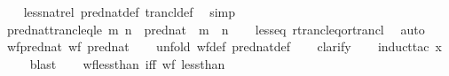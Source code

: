 \begin{isabellebody}
\ \ %
\endisadelimproof
%
\isatagproof
{}\isamarkupfalse%
\ less{\isacharunderscore}{\kern0pt}nat{\isacharunderscore}{\kern0pt}rel\ pred{\isacharunderscore}{\kern0pt}nat{\isacharunderscore}{\kern0pt}def\ trancl{\isacharunderscore}{\kern0pt}def\ \isamarkupfalse%
\ simp%
\endisatagproof
{\isafoldproof}%
%
\isadelimproof
\isanewline
%
\endisadelimproof
\isanewline
{}\isamarkupfalse%
\ pred{\isacharunderscore}{\kern0pt}nat{\isacharunderscore}{\kern0pt}trancl{\isacharunderscore}{\kern0pt}eq{\isacharunderscore}{\kern0pt}le{\isacharcolon}{\kern0pt}\ {\isachardoublequoteopen}{\isacharparenleft}{\kern0pt}m{\isacharcomma}{\kern0pt}\ n{\isacharparenright}{\kern0pt}\ {\isasymin}\ pred{\isacharunderscore}{\kern0pt}nat\isactrlsup {\isacharasterisk}{\kern0pt}\ {\isasymlongleftrightarrow}\ m\ {\isasymle}\ n{\isachardoublequoteclose}\isanewline
%
\isadelimproof
\ \ %
\endisadelimproof
%
\isatagproof
{}\isamarkupfalse%
\ less{\isacharunderscore}{\kern0pt}eq\ rtrancl{\isacharunderscore}{\kern0pt}eq{\isacharunderscore}{\kern0pt}or{\isacharunderscore}{\kern0pt}trancl\ \isamarkupfalse%
\ auto%
\endisatagproof
{\isafoldproof}%
%
\isadelimproof
\isanewline
%
\endisadelimproof
\isanewline
{}\isamarkupfalse%
\ wf{\isacharunderscore}{\kern0pt}pred{\isacharunderscore}{\kern0pt}nat{\isacharcolon}{\kern0pt}\ {\isachardoublequoteopen}wf\ pred{\isacharunderscore}{\kern0pt}nat{\isachardoublequoteclose}\isanewline
%
\isadelimproof
\ \ %
\endisadelimproof
%
\isatagproof
{}\isamarkupfalse%
\ {\isacharparenleft}{\kern0pt}unfold\ wf{\isacharunderscore}{\kern0pt}def\ pred{\isacharunderscore}{\kern0pt}nat{\isacharunderscore}{\kern0pt}def{\isacharparenright}{\kern0pt}\isanewline
\ \ \isamarkupfalse%
\ clarify\isanewline
\ \ \isamarkupfalse%
\ {\isacharparenleft}{\kern0pt}induct{\isacharunderscore}{\kern0pt}tac\ x{\isacharparenright}{\kern0pt}\isanewline
\ \ \ \isamarkupfalse%
\ blast{\isacharplus}{\kern0pt}\isanewline
\ \ \isamarkupfalse%
%
\endisatagproof
{\isafoldproof}%
%
\isadelimproof
\isanewline
%
\endisadelimproof
\isanewline
{}\isamarkupfalse%
\ wf{\isacharunderscore}{\kern0pt}less{\isacharunderscore}{\kern0pt}than\ {\isacharbrackleft}{\kern0pt}iff{\isacharbrackright}{\kern0pt}{\isacharcolon}{\kern0pt}\ {\isachardoublequoteopen}wf\ less{\isacharunderscore}{\kern0pt}than{\isachardoublequoteclose}\isanewline
%
\isadelimproof
\ \ %
\endisadelimproof
%
\isatagproof
{}\isamarkupfalse%

\end{isabellebody}
